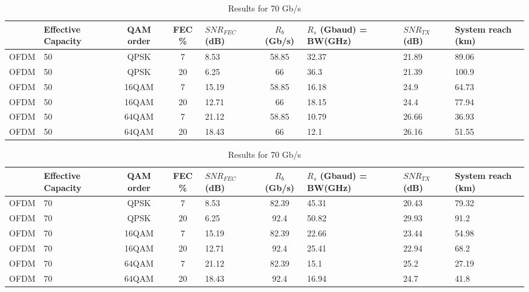 \documentclass{article}
\begin{document}
\begin{table}[htb!]
    \centering
    \begin{tabular}{|c|p{1.5cm}|c|c|p{1.5cm}|c|p{1.5cm}|p{1.5cm}|p{1cm}|}
    \hline
         & Effective Capacity & QAM order & FEC \%  &  $SNR_{FEC}$ (dB) & $R_b$ (Gb/s) & $R_s$ (Gbaud) = BW(GHz) & $SNR_{TX}$ (dB) & System reach (km) \\ \hline
         OFDM & 50 & QPSK & 7 & 8.53 & 58.85 & 32.37 & 21.89 & 89.06 \\ \hline
         OFDM & 50 & QPSK & 20 & 6.25 & 66 & 36.3 & 21.39 & 100.9 \\ \hline
         OFDM & 50 & 16QAM & 7 & 15.19 & 58.85 & 16.18 & 24.9 & 64.73 \\ \hline
         OFDM & 50 & 16QAM & 20 & 12.71 & 66 & 18.15 & 24.4 & 77.94 \\ \hline
         OFDM & 50 & 64QAM & 7 & 21.12 & 58.85 & 10.79 & 26.66 &  36.93 \\ \hline
         OFDM & 50 & 64QAM & 20 & 18.43 & 66 & 12.1 & 26.16 & 51.55 \\ \hline

    \end{tabular}
    \caption{Results for 50 Gb/s}
    
    \begin{tabular}{|c|p{1.5cm}|c|c|p{1.5cm}|c|p{1.5cm}|p{1.5cm}|p{1cm}|}
    \hline
         & Effective Capacity & QAM order & FEC \%  &  $SNR_{FEC}$ (dB) & $R_b$ (Gb/s) & $R_s$ (Gbaud) = BW(GHz) & $SNR_{TX}$ (dB) & System reach (km) \\ \hline
         OFDM & 70 & QPSK & 7 & 8.53 & 82.39 & 45.31 & 20.43 & 79.32 \\ \hline
         OFDM & 70 & QPSK & 20 & 6.25 & 92.4 & 50.82 & 29.93 & 91.2 \\ \hline
         OFDM & 70 & 16QAM & 7 & 15.19 & 82.39 & 22.66 & 23.44 & 54.98 \\ \hline
         OFDM & 70 & 16QAM & 20 & 12.71 & 92.4 & 25.41 & 22.94 & 68.2 \\ \hline
         OFDM & 70 & 64QAM & 7 & 21.12 & 82.39 & 15.1 & 25.2 &  27.19 \\ \hline
         OFDM & 70 & 64QAM & 20 & 18.43 & 92.4 & 16.94 & 24.7 & 41.8 \\ \hline

    \end{tabular}
    \caption{Results for 70 Gb/s}
    

\end{table}
\end{document}
